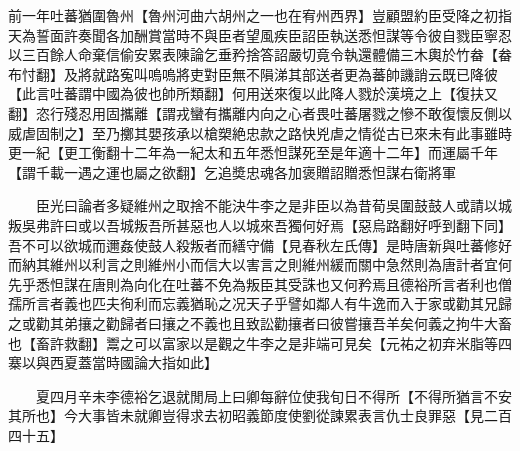 前一年吐蕃猶圍魯州【魯州河曲六胡州之一也在宥州西界】豈顧盟約臣受降之初指天為誓面許奏聞各加酬賞當時不與臣者望風疾臣詔臣執送悉怛謀等令彼自戮臣寧忍以三百餘人命棄信偷安累表陳論乞垂矜捨答詔嚴切竟令執還體備三木輿於竹畚【畚布忖翻】及將就路寃叫嗚嗚將吏對臣無不隕涕其部送者更為蕃帥譏誚云既已降彼【此言吐蕃謂中國為彼也帥所類翻】何用送來復以此降人戮於漢境之上【復扶又翻】恣行殘忍用固攜離【謂戎蠻有攜離内向之心者畏吐蕃屠戮之慘不敢復懷反側以威虐固制之】至乃擲其嬰孩承以槍槊絶忠款之路快兇虐之情從古已來未有此事雖時更一紀【更工衡翻十二年為一紀太和五年悉怛謀死至是年適十二年】而運屬千年【謂千載一遇之運也屬之欲翻】乞追奬忠魂各加褒贈詔贈悉怛謀右衛將軍

　　臣光曰論者多疑維州之取捨不能決牛李之是非臣以為昔荀吳圍鼓鼓人或請以城叛吳弗許曰或以吾城叛吾所甚惡也人以城來吾獨何好焉【惡烏路翻好呼到翻下同】吾不可以欲城而邇姦使鼓人殺叛者而繕守備【見春秋左氏傳】是時唐新與吐蕃修好而納其維州以利言之則維州小而信大以害言之則維州緩而關中急然則為唐計者宜何先乎悉怛謀在唐則為向化在吐蕃不免為叛臣其受誅也又何矜焉且德裕所言者利也僧孺所言者義也匹夫徇利而忘義猶恥之况天子乎譬如鄰人有牛逸而入于家或勸其兄歸之或勸其弟攘之勸歸者曰攘之不義也且致訟勸攘者曰彼嘗攘吾羊矣何義之拘牛大畜也【畜許救翻】鬻之可以富家以是觀之牛李之是非端可見矣【元祐之初弃米脂等四寨以與西夏蓋當時國論大指如此】

　　夏四月辛未李德裕乞退就閒局上曰卿每辭位使我旬日不得所【不得所猶言不安其所也】今大事皆未就卿豈得求去初昭義節度使劉從諫累表言仇士良罪惡【見二百四十五】

